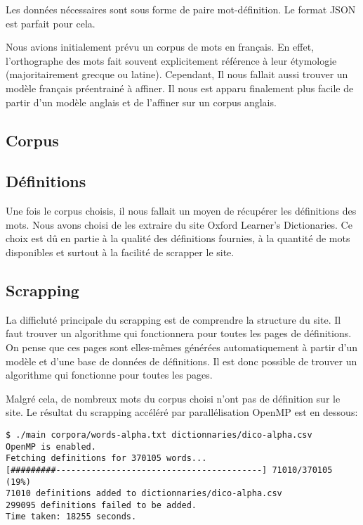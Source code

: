 \documentclass[french]{template}
\begin{document}
Les données nécessaires sont sous forme de paire mot-définition. Le format JSON est parfait pour cela.

Nous avions initialement prévu un corpus de mots en français. En effet, l'orthographe des mots fait souvent explicitement référence à leur étymologie (majoritairement grecque ou latine). Cependant, Il nous fallait aussi trouver un modèle français préentrainé à affiner. Il nous est apparu finalement plus facile de partir d'un modèle anglais et de l'affiner sur un corpus anglais.

\subsection{Corpus}


\subsection{Définitions}

Une fois le corpus choisis, il nous fallait un moyen de récupérer les définitions des mots. Nous avons choisi de les extraire du site Oxford Learner's Dictionaries. Ce choix est dû en partie à la qualité des définitions fournies, à la quantité de mots disponibles et surtout à la facilité de scrapper le site.

\subsection{Scrapping}

La difficluté principale du scrapping est de comprendre la structure du site. Il faut trouver un algorithme qui fonctionnera pour toutes les pages de définitions. On pense que ces pages sont elles-mêmes générées automatiquement à partir d'un modèle et d'une base de données de définitions. Il est donc possible de trouver un algorithme qui fonctionne pour toutes les pages.

Malgré cela, de nombreux mots du corpus choisi n'ont pas de définition sur le site. Le résultat du scrapping accéléré par parallélisation OpenMP est en dessous:

\begin{verbatim}
$ ./main corpora/words-alpha.txt dictionnaries/dico-alpha.csv
OpenMP is enabled.
Fetching definitions for 370105 words...
[#########-----------------------------------------] 71010/370105 (19%)
71010 definitions added to dictionnaries/dico-alpha.csv
299095 definitions failed to be added.
Time taken: 18255 seconds.

\end{verbatim}
\end{document}
